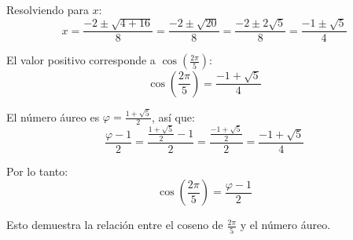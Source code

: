 Resolviendo para $x$:
\begin{equation*}
x = \frac{-2 \pm \sqrt{4 + 16}}{8} = \frac{-2 \pm \sqrt{20}}{8} = \frac{-2 \pm 2\sqrt{5}}{8} = \frac{-1 \pm \sqrt{5}}{4}
\end{equation*}

El valor positivo corresponde a $\cos\left(\frac{2\pi}{5}\right)$:
\begin{equation*}
\cos\left(\frac{2\pi}{5}\right) = \frac{-1 + \sqrt{5}}{4}
\end{equation*}

El número áureo es $\varphi = \frac{1 + \sqrt{5}}{2}$, así que:
\begin{equation*}
\frac{\varphi - 1}{2} = \frac{\frac{1 + \sqrt{5}}{2} - 1}{2} = \frac{\frac{-1 + \sqrt{5}}{2}}{2} = \frac{-1 + \sqrt{5}}{4}
\end{equation*}

Por lo tanto:
\begin{equation*}
\cos\left(\frac{2\pi}{5}\right) = \frac{\varphi - 1}{2}
\end{equation*}

Esto demuestra la relación entre el coseno de $\frac{2\pi}{5}$ y el número áureo.
